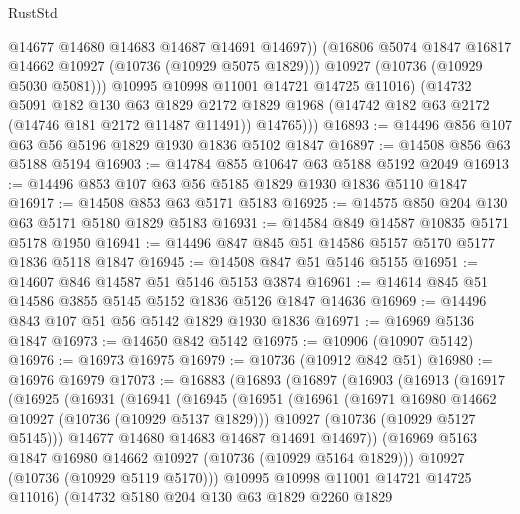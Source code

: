 \begin{lexlean}{RustStd}
\begin{coremodule}
                @14677
                @14680
                @14683
                @14687
                @14691
                @14697))
            (@16806 @5074 @1847 @16817 @14662 @10927 (@10736 (@10929 @5075 @1829)))
            @10927
            (@10736 (@10929 @5030 @5081)))
          @10995
          @10998
          @11001
          @14721
          @14725
          @11016)
        (@14732
          @5091
          @182
          @130
          @63
          @1829
          @2172
          @1829
          @1968
          (@14742 @182 @63 @2172 (@14746 @181 @2172 @11487 @11491))
          @14765)))
@16893 := @14496 @856 @107 @63 @56 @5196 @1829 @1930 @1836 @5102 @1847
@16897 := @14508 @856 @63 @5188 @5194
@16903 := @14784 @855 @10647 @63 @5188 @5192 @2049
@16913 := @14496 @853 @107 @63 @56 @5185 @1829 @1930 @1836 @5110 @1847
@16917 := @14508 @853 @63 @5171 @5183
@16925 := @14575 @850 @204 @130 @63 @5171 @5180 @1829 @5183
@16931 := @14584 @849 @14587 @10835 @5171 @5178 @1950
@16941 := @14496 @847 @845 @51 @14586 @5157 @5170 @5177 @1836 @5118 @1847
@16945 := @14508 @847 @51 @5146 @5155
@16951 := @14607 @846 @14587 @51 @5146 @5153 @3874
@16961 := @14614 @845 @51 @14586 @3855 @5145 @5152 @1836 @5126 @1847 @14636
@16969 := @14496 @843 @107 @51 @56 @5142 @1829 @1930 @1836
@16971 := @16969 @5136 @1847
@16973 := @14650 @842 @5142
@16975 := @10906 (@10907 @5142)
@16976 := @16973 @16975
@16979 := @10736 (@10912 @842 @51)
@16980 := @16976 @16979
@17073 := @16883
    (@16893
      (@16897
        (@16903
          (@16913
            (@16917
              (@16925
                (@16931
                  (@16941
                    (@16945
                      (@16951
                        (@16961
                          (@16971 @16980 @14662 @10927 (@10736 (@10929 @5137 @1829)))
                          @10927
                          (@10736 (@10929 @5127 @5145)))
                        @14677
                        @14680
                        @14683
                        @14687
                        @14691
                        @14697))
                    (@16969 @5163 @1847 @16980 @14662 @10927 (@10736 (@10929 @5164 @1829)))
                    @10927
                    (@10736 (@10929 @5119 @5170)))
                  @10995
                  @10998
                  @11001
                  @14721
                  @14725
                  @11016)
                (@14732
                  @5180
                  @204
                  @130
                  @63
                  @1829
                  @2260
                  @1829

\end{coremodule}
\end{lexlean}
